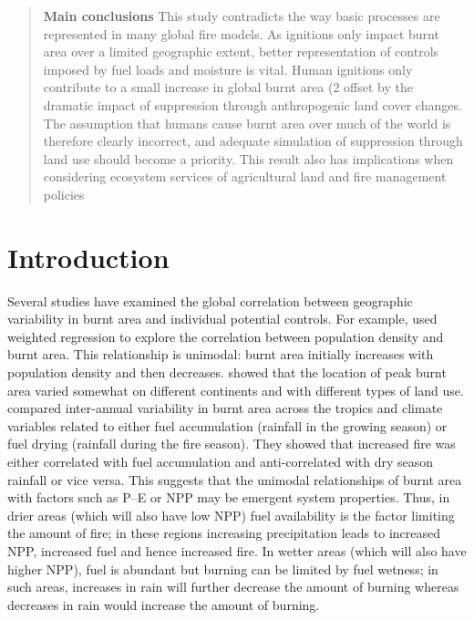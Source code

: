 \documentclass[12pt]{article}
\begin{document}
\begin{abstract}
    \textbf{Main conclusions}
    This study contradicts the way basic processes are represented in many global fire models.
    As ignitions only impact burnt area over a limited geographic extent, better representation of controls imposed by fuel loads and moisture is vital. Human ignitions only contribute to a small increase in global burnt area (2%
    offset by the dramatic impact of suppression through anthropogenic land cover changes.
    The assumption
    that humans cause burnt area over much of the world is therefore clearly incorrect, and adequate simulation
    of suppression through land use should become a priority. This result also has implications when considering
    ecosystem services of agricultural land and fire management policies
\end{abstract}


\section{Introduction}

Several studies have examined the global correlation between geographic variability in burnt area and individual potential controls. For example, \citet{bistinas2014causal} used weighted regression to explore the correlation between population density and burnt area. This relationship is unimodal: burnt area initially increases with population density and then decreases. \citet{bistinas2014causal} showed that the location of peak burnt area varied somewhat on different continents and with different types of land use. \citet{van2008climate} compared inter-annual variability in burnt area across the tropics and climate variables related to either fuel accumulation (rainfall in the growing season) or fuel drying (rainfall during the fire season). They showed that increased fire was either correlated with fuel accumulation and anti-correlated with dry season rainfall or vice versa. This suggests that the unimodal relationships of burnt area with factors such as P--E or NPP may be emergent system properties. Thus, in drier areas (which will also have low NPP) fuel availability is the factor limiting the amount of fire; in these regions increasing precipitation leads to increased NPP, increased fuel and hence increased fire. In wetter areas (which will also have higher NPP), fuel is abundant but burning can be limited by fuel wetness; in such areas, increases in rain will further decrease the amount of burning whereas decreases in rain would increase the amount of burning.
\end{document}
